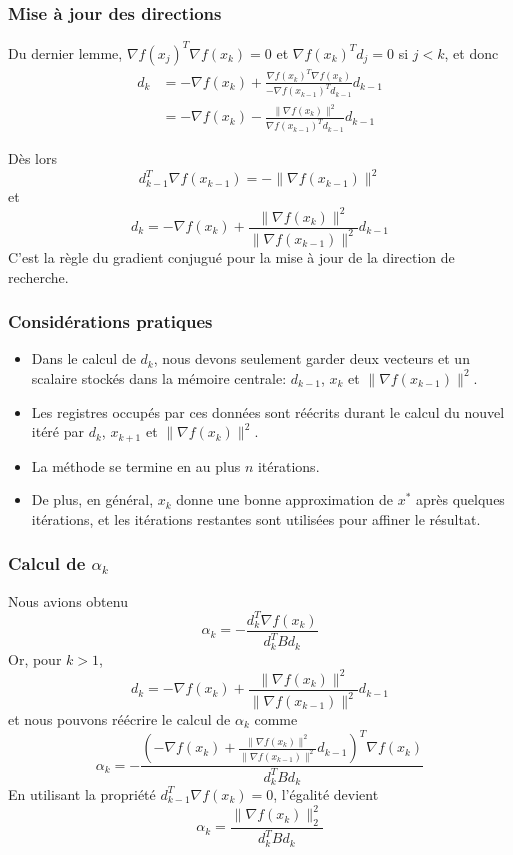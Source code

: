 \documentclass[usepdftitle=false]{beamer}
\def\blue{\color{blue}}
\begin{document}
\begin{frame}
\frametitle{Mise à jour des directions}

Du dernier lemme, $\nabla f(x_j)^T \nabla f(x_k) = 0$ et $\nabla f(x_k)^T d_j = 0$ si $j < k$, et donc
\begin{align*}
d_k
&= -\nabla f(x_k) + \frac{\nabla f(x_k)^T\nabla f(x_k)}{-\nabla f(x_{k-1})^Td_{k-1}} d_{k-1} \\
&= -\nabla f(x_k) - \frac{\| \nabla f(x_k) \|^2}{\nabla f(x_{k-1})^Td_{k-1}} d_{k-1}
\end{align*}

Dès lors
$$
d_{k-1}^T\nabla f(x_{k-1})
= - \| \nabla f(x_{k-1}) \|^2
$$
et
$$
d_k = -\nabla f(x_k) + \frac{\| \nabla f(x_k) \|^2}{\| \nabla f(x_{k-1}) \|^2} d_{k-1}
$$
C'est la règle du {\blue gradient conjugué} pour la mise à jour de la direction de recherche.

\end{frame}

\begin{frame}
\frametitle{Considérations pratiques}

\begin{itemize}
\item
Dans le calcul de $d_k$, nous devons seulement garder deux vecteurs et un scalaire stockés dans la mémoire centrale: $d_{k-1}$, $x_k$ et $\| \nabla f(x_{k-1}) \|^2$.
\item
Les registres occupés par ces données sont réécrits durant le calcul du nouvel itéré par
$d_k$, $x_{k+1}$ et $\| \nabla f(x_k) \|^2$.
\item
La méthode se termine en au plus $n$ itérations.
\item
De plus, en général, $x_k$ donne une bonne approximation de $x^*$ après quelques itérations, et les itérations restantes sont utilisées pour affiner le résultat.
\end{itemize}

\end{frame}

\begin{frame}
\frametitle{Calcul de $\alpha_k$}

Nous avions obtenu
$$
\alpha_k = -\frac{d_k^T \nabla f(x_k)}{d_k^T B d_k}
$$
Or, pour $k > 1$,
$$
d_k = -\nabla f(x_{k}) + \frac{\| \nabla f(x_{k}) \|^2}{\| \nabla f(x_{k-1}) \|^2} d_{k-1}
$$
et nous pouvons réécrire le calcul de $\alpha_k$ comme
$$
\alpha_k = -\frac{(-\nabla f(x_{k}) + \frac{\| \nabla f(x_{k}) \|^2}{\| \nabla f(x_{k-1}) \|^2} d_{k-1})^T \nabla f(x_k)}{d_k^T B d_k}
$$
En utilisant la propriété $d_{k-1}^T \nabla f(x_k) = 0$, l'égalité devient 
$$
\alpha_k = \frac{\| \nabla f(x_k) \|_2^2}{d_k^T B d_k}
$$

\end{frame}
\end{document}
